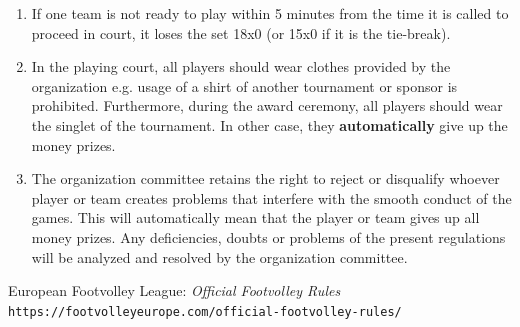 \documentclass[a4paper,11pt]{article}
\begin{document}
\begin{enumerate}
\item If one team is not ready to play within 5 minutes from the time it is
  called to proceed in court, it loses the set 18x0 (or 15x0 if it is the
  tie-break).


\item In the playing court, all players should wear clothes provided by the
  organization e.g. usage of a shirt of another tournament or sponsor is
  prohibited. Furthermore, during the award ceremony, all players should wear
  the singlet of the tournament. In other case, they \textbf{automatically} give
  up the money prizes.

\item The organization committee retains the right to reject or disqualify
  whoever player or team creates problems that interfere with the smooth conduct
  of the games. This will automatically mean that the player or team gives up
  all money prizes. Any deficiencies, doubts or problems of the present
  regulations will be analyzed and resolved by the organization committee.

\end{enumerate}

\renewcommand{\refname}{}

\begin{thebibliography}{1}

  European Footvolley League:
  \textit{Official Footvolley Rules}
  \\\texttt{https://footvolleyeurope.com/official-footvolley-rules/}

\end{thebibliography}
\end{document}
